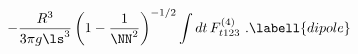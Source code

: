 \begin{equation}
-{R^3\over3\pi g\ls^3}\left(1-{1\over \NN^2}\right)^{-1/2}\int dt\,F^{(4)}_{t123}\ .
\labell{dipole}
\end{equation}

